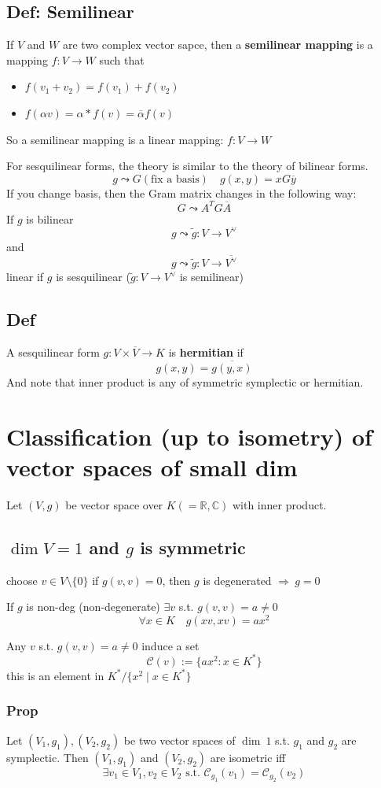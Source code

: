 \documentclass{book}
\begin{document}
\section{Def: Semilinear}
If $V$ and $W$ are two complex vector sapce, then a \textbf{semilinear mapping} is a mapping $f:V\rightarrow W$ such that
\begin{itemize}
    \item $f(v_1+v_2)=f(v_1)+f(v_2)$
    \item $f(\alpha v)=\alpha*f(v)=\overline{\alpha}f(v)$
\end{itemize}
So a semilinear mapping is a linear mapping: $f:V\rightarrow W$

For sesquilinear forms, the theory is similar to the theory of bilinear forms.
$$g\leadsto G(\text{fix a basis})\quad g(x,y)=xG\overline{y}$$
If you change basis, then the Gram matrix changes in the following way:
$$G\leadsto A^TG\overline{A}$$
If $g$ is bilinear
$$g\leadsto \tilde{g}:V\rightarrow V^\vee$$
and $$g\leadsto\tilde{g}:V\rightarrow\overline{V^\vee}$$
linear if $g$ is sesquilinear ($\tilde{g}:V\rightarrow V^\vee$ is semilinear)
\section{Def}
A sesquilinear form $g:V\times \overline{V}\rightarrow K$ is \textbf{hermitian} if
$$g(x,y)=\overline{g(y,x)}$$
And note that inner product is any of symmetric symplectic or hermitian.
\chapter{Classification (up to isometry) of vector spaces of small dim}
Let $(V,g)$ be vector space over $K(=\mathbb{R},\mathbb{C})$ with inner product.
\section{$\dim V=1$ and $g$ is symmetric}
choose $v\in V\setminus\{0\}$ if $g(v,v)=0$, then $g$ is degenerated $\Rightarrow\ g=0$

If $g$ is non-deg (non-degenerate) $\exists v$ s.t. $g(v,v)=a\neq0$$$\forall x\in K\quad g(xv,xv)=ax^2$$

Any $v$ s.t. $g(v,v)=a\neq0$ induce a set
$$\mathcal{C}(v):=\{ax^2:x\in K^*\}$$ this is an element in $K^*/\{x^2\mid x\in K^*\}$
\subsection{Prop}Let $(V_1,g_1),(V_2,g_2)$ be two vector spaces of $\dim\ 1$ s.t. $g_1$ and $g_2$ are symplectic. Then $(V_1,g_1)$ and $(V_2,g_2)$ are isometric iff
$$\exists v_1\in V_1,v_2\in V_2\text{ s.t. }\mathcal{C}_{g_1}(v_1)=\mathcal{C}_{g_2}(v_2)$$
\end{document}

